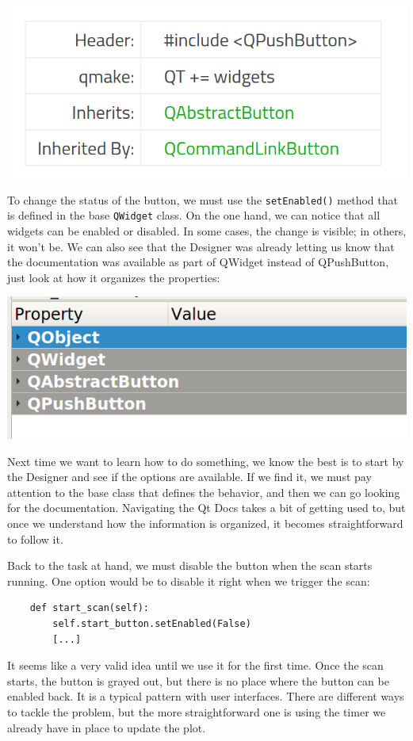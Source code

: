 \begin{center}
    \includegraphics[width=.4\linewidth]{images/Chapter_09/11_Qt_Docs_inheritance.png}
\end{center}

To change the status of the button, we must use the \texttt{setEnabled()} method that is defined in the base \texttt{QWidget} class. On the one hand, we can notice that all widgets can be enabled or disabled. In some cases, the change is visible; in others, it won't be. We can also see that the Designer was already letting us know that the documentation was available as part of QWidget instead of QPushButton, just look at how it organizes the properties:

\begin{center}
    \includegraphics[width=.4\linewidth]{images/Chapter_09/12_Designer_object_inheritance.png}
\end{center}

Next time we want to learn how to do something, we know the best is to start by the Designer and see if the options are available. If we find it, we must pay attention to the base class that defines the behavior, and then we can go looking for the documentation. Navigating the Qt Docs takes a bit of getting used to, but once we understand how the information is organized, it becomes straightforward to follow it.

Back to the task at hand, we must disable the button when the scan starts running. One option would be to disable it right when we trigger the scan:

\begin{verbatim}
    def start_scan(self):
        self.start_button.setEnabled(False)
        [...]
\end{verbatim}

It seems like a very valid idea until we use it for the first time. Once the scan starts, the button is grayed out, but there is no place where the button can be enabled back. It is a typical pattern with user interfaces. There are different ways to tackle the problem, but the more straightforward one is using the timer we already have in place to update the plot.

